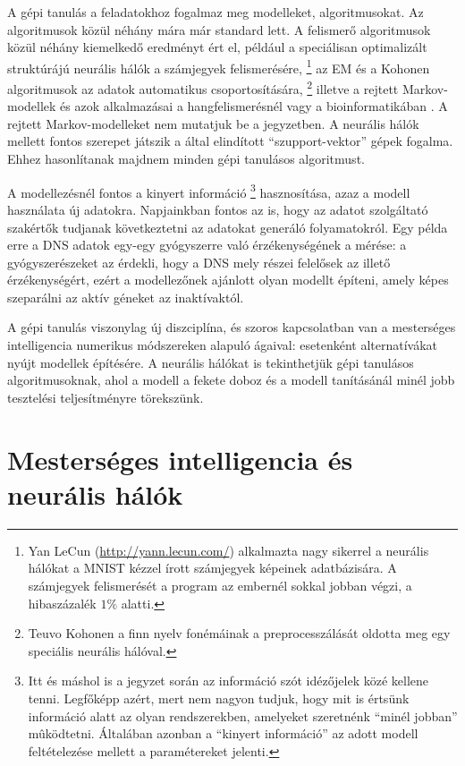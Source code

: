 A gépi tanulás a feladatokhoz fogalmaz meg modelleket, algoritmusokat. Az algoritmusok közül néhány mára már standard lett.  A felismerő algoritmusok közül néhány kiemelkedő eredményt ért el, például a speciálisan optimalizált struktúrájú neurális hálók a számjegyek felismerésére,%
\footnote{%
 Yan LeCun (\url{http://yann.lecun.com/}\label{link:lecun}) alkalmazta nagy sikerrel a neurális hálókat a MNIST kézzel írott számjegyek képeinek adatbázisára. A számjegyek felismerését a program az embernél sokkal jobban végzi, a hibaszázalék $1\%$ alatti.
}  %
az EM és a Kohonen algoritmusok az adatok automatikus csoportosítására,%
\footnote{%
    Teuvo Kohonen a finn nyelv fonémáinak a preprocesszálását oldotta meg egy speciális neurális hálóval.
}  %
illetve a rejtett Markov-modellek és azok alkalmazásai a
hangfelismerésnél \cite{RabinerJuang93} vagy a bioinformatikában
\cite{BaldiBrunak98}. A rejtett Markov-modelleket nem mutatjuk be
a jegyzetben. A neurális hálók mellett fontos szerepet játszik a
 által elindított ``szupport-vektor'' gépek
fogalma. Ehhez hasonlítanak majdnem minden gépi tanulásos
algoritmust.

A modellezésnél fontos a kinyert információ%
\footnote{%
  Itt és máshol is a jegyzet során az információ szót idézőjelek közé kellene tenni. Legfőképp azért, mert nem nagyon tudjuk, hogy mit is értsünk információ alatt az olyan rendszerekben, amelyeket szeretnénk ``minél jobban'' mûködtetni.  Általában azonban a ``kinyert információ'' az adott modell feltételezése mellett a paramétereket jelenti.
}  %
hasznosítása, azaz a modell használata új adatokra. Napjainkban
fontos az is, hogy az adatot szolgáltató szakértők tudjanak
következtetni az adatokat generáló folyamatokról. Egy
példa erre a DNS adatok egy-egy gyógyszerre való érzékenységének a
mérése: a gyógyszerészeket az érdekli, hogy a DNS mely részei
felelősek az illető érzékenységért, ezért a modellezőnek ajánlott
olyan modellt építeni, amely képes szeparálni az aktív géneket az
inaktívaktól.

A gépi tanulás viszonylag új diszciplína, és szoros kapcsolatban
van a mesterséges intelligencia numerikus módszereken alapuló ágaival:
esetenként alternatívákat nyújt modellek építésére. A neurális
hálókat is tekinthetjük gépi tanulásos algoritmusoknak, ahol a
modell a fekete doboz és a modell tanításánál minél jobb tesztelési
teljesítményre törekszünk.

\section{Mesterséges intelligencia és neurális hálók}\label{sec:ALAP:mi}


